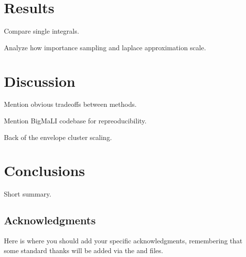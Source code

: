 \documentclass[\docopts]{\docclass}
\begin{document}
\section{Results}
\label{sec:results}

Compare single integrals.

Analyze how importance sampling and laplace approximation scale.



\section{Discussion}
\label{sec:discussion}


Mention obvious tradeoffs between methods.

Mention BigMaLI codebase for repreoducibility.

Back of the envelope cluster scaling.


\section{Conclusions}
\label{sec:conclusions}

Short summary.


\subsection*{Acknowledgments}

Here is where you should add your specific acknowledgments, remembering that some standard thanks will be added via the  and  files.







\end{document}
